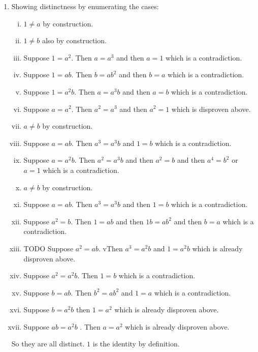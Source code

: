 \documentclass[11pt,oneside]{article}
\numberwithin{equation}{section}
\theoremstyle{definition}
\begin{document}
\begin{solution}
  \begin{enumerate}
    \item
    Showing distinctness by enumerating the cases:
    \begin{enumerate}[(i)]
    \item
      $1 \neq a$ by construction.
    \item
      $1 \neq b$ also by construction.
    \item
      Suppose $1 = a^2$.  Then $a = a^3$ and then $a = 1$ which is a contradiction.
    \item
      Suppose $1 = ab$.  Then $b = ab^2 $ and then $ b = a$ which is a contradiction.
    \item
      Suppose $1 = a^2b$.  Then $a = a^3b$ and then $a = b$ which is a contradiction.
    \item
      Suppose $ a = a^2$.  Then $a^2 = a^3$ and then $a^2 = 1$ which is disproven above.
    \item
      $a \neq b$ by construction.
    \item
      Suppose $a = ab$.  Then $a^3 = a^3 b$ and $1 = b$ which is a contradiction.
    \item
      Suppose $a = a^2 b$. Then $a^2 = a^3 b$ and then $a^2 = b$ and then $a^4 = b^2$ or $a = 1$ which is a contradiction.
    \item
      $a \neq b$ by construction.
    \item
      Suppose $ a = ab$.  Then $ a^3 = a^3 b$ and then $1 = b$ which is a contradiction.
    \item
      Suppose $a^2 = b$.  Then $ 1 = ab$ and then $ 1 b = a b^2$ and then $b = a$ which is a contradiction.  
    \item
      TODO Suppose $a^2 = ab$.  vThen $a^3 = a^2 b$ and $1 = a^2b$ which is already disproven above.  
    \item
      Suppose $a^2 = a^2b$.  Then $1 = b$ which is a contradiction. 
    \item
      Suppose $b = ab$.  Then $b^2 = a b ^2$ and $1 = a$ which is a contradiction.
    \item
      Suppose $b=a^2b$ then $1 = a^2$ which is already disproven above.  
    \item
      Suppose $ab = a^2b$ .  Then $ a = a^2$ which is already disproven above.
    \end{enumerate}
    So they are all distinct.  $1$ is the identity by definition.
    

\end{enumerate}
\end{solution}
\end{document}
